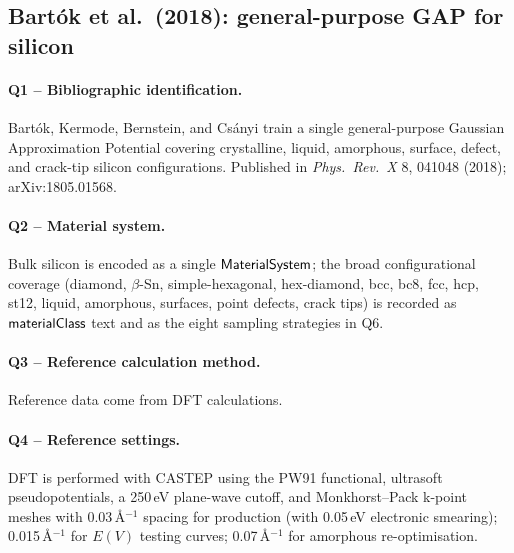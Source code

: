 \subsection{Bart\'ok et al.\ (2018): general-purpose GAP for silicon}
\label{sec:appendix-example-bartok2018si}

\paragraph{Q1 -- Bibliographic identification.}
Bart\'ok, Kermode, Bernstein, and Cs\'anyi train a single
general-purpose Gaussian Approximation Potential covering crystalline,
liquid, amorphous, surface, defect, and crack-tip silicon
configurations. Published in \emph{Phys.\ Rev.\ X} 8, 041048 (2018);
arXiv:1805.01568.


\paragraph{Q2 -- Material system.}
Bulk silicon is encoded as a single $\mathsf{MaterialSystem}$; the broad
configurational coverage (diamond, $\beta$-Sn, simple-hexagonal,
hex-diamond, bcc, bc8, fcc, hcp, st12, liquid, amorphous, surfaces,
point defects, crack tips) is recorded as
$\mathsf{materialClass}$ text and as the eight sampling strategies
in Q6.


\paragraph{Q3 -- Reference calculation method.}
Reference data come from DFT calculations.


\paragraph{Q4 -- Reference settings.}
DFT is performed with CASTEP using the PW91 functional, ultrasoft
pseudopotentials, a 250\,eV plane-wave cutoff, and Monkhorst--Pack
k-point meshes with 0.03\,\AA$^{-1}$ spacing for production (with
0.05\,eV electronic smearing); 0.015\,\AA$^{-1}$ for $E(V)$ testing
curves; 0.07\,\AA$^{-1}$ for amorphous re-optimisation.


